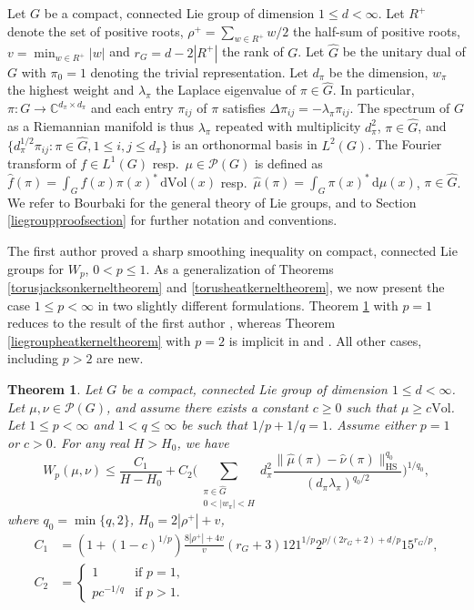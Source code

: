 \documentclass[11pt,a4paper]{article}
\newtheorem{thm}{Theorem}
\theoremstyle{definition}
\begin{document}
Let $G$ be a compact, connected Lie group of dimension $1 \le d < \infty$. Let $R^+$ denote the set of positive roots, $\rho^+=\sum_{w \in R^+} w/2$ the half-sum of positive roots, $v=\min_{w \in R^+} |w|$ and $r_G=d-2|R^+|$ the rank of $G$. Let $\widehat{G}$ be the unitary dual of $G$ with $\pi_0=1$ denoting the trivial representation. Let $d_{\pi}$ be the dimension, $w_{\pi}$ the highest weight and $\lambda_{\pi}$ the Laplace eigenvalue of $\pi \in \widehat{G}$. In particular, $\pi: G \to \mathbb{C}^{d_{\pi} \times d_{\pi}}$ and each entry $\pi_{ij}$ of $\pi$ satisfies $\Delta \pi_{ij} = - \lambda_{\pi} \pi_{ij}$. The spectrum of $G$ as a Riemannian manifold is thus $\lambda_{\pi}$ repeated with multiplicity $d_{\pi}^2$, $\pi \in \widehat{G}$, and $\{ d_{\pi}^{1/2} \pi_{ij} : \pi \in \widehat{G}, 1 \le i,j \le d_{\pi} \}$ is an orthonormal basis in $L^2 (G)$. The Fourier transform of $f \in L^1(G)$ resp.\ $\mu \in \mathcal{P}(G)$ is defined as $\widehat{f}(\pi) = \int_G f(x) \pi(x)^* \, \mathrm{d}\mathrm{Vol}(x)$ resp.\ $\widehat{\mu}(\pi) = \int_G \pi(x)^* \, \mathrm{d}\mu (x)$, $\pi \in \widehat{G}$. We refer to Bourbaki \cite{BOU} for the general theory of Lie groups, and to Section \ref{liegroupproofsection} for further notation and conventions.

The first author \cite{BOR1} proved a sharp smoothing inequality on compact, connected Lie groups for $W_p$, $0<p \le 1$. As a generalization of Theorems \ref{torusjacksonkerneltheorem} and \ref{torusheatkerneltheorem}, we now present the case $1 \le p < \infty$ in two slightly different formulations. Theorem \ref{liegroupjacksonkerneltheorem} with $p=1$ reduces to the result of the first author \cite{BOR1}, whereas Theorem \ref{liegroupheatkerneltheorem} with $p=2$ is implicit in \cite{BOR2} and \cite{BS}. All other cases, including $p>2$ are new.
\begin{thm}\label{liegroupjacksonkerneltheorem} Let $G$ be a compact, connected Lie group of dimension $1 \le d < \infty$. Let $\mu, \nu \in \mathcal{P}(G)$, and assume there exists a constant $c \ge 0$ such that $\mu \ge c \mathrm{Vol}$. Let $1 \le p < \infty$ and $1<q \le \infty$ be such that $1/p+1/q=1$. Assume either $p=1$ or $c>0$. For any real $H>H_0$, we have
\[ W_p (\mu, \nu) \le \frac{C_1}{H-H_0} + C_2 \Bigg( \sum_{\substack{\pi \in \widehat{G} \\ 0<|w_{\pi}| < H}} d_{\pi}^2 \frac{\| \widehat{\mu}(\pi) - \widehat{\nu}(\pi) \|_{\mathrm{HS}}^{q_0}}{(d_{\pi} \lambda_{\pi})^{q_0 /2}} \Bigg)^{1/q_0} , \]
where $q_0= \min \{ q, 2 \}$, $H_0=2 |\rho^+|+v$,
\[ \begin{split} C_1 &= (1+(1-c)^{1/p}) \frac{8 |\rho^+|+4v}{v} (r_G+3) 121^{1/p} 2^{p/(2r_G+2)+d/p} 15^{r_G/p}, \\ C_2 &= \left\{ \begin{array}{ll} 1 & \textrm{if } p=1, \\ pc^{-1/q} & \textrm{if } p>1. \end{array} \right. \end{split} \]
\end{thm}
\end{document}
